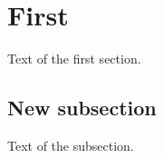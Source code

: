 \listofexample
\section{First}
\startcontents
{}
Text of the first section.
\subsection{New subsection}
Text of the subsection.
